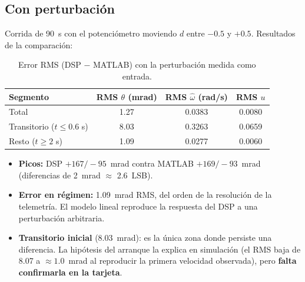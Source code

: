 \documentclass[11pt,a4paper]{article}
\begin{document}
\subsection{Con perturbaci\'on}
Corrida de 90~s con el potenci\'ometro moviendo $d$ entre $-0.5$ y $+0.5$. Resultados de la comparaci\'on:
\begin{table}[H]\centering\small
\begin{tabular}{@{}lccc@{}}\toprule
Segmento & RMS $\theta$ (mrad) & RMS $\hat\omega$ (rad/s) & RMS $u$ \\ \midrule
Total & 1.27 & 0.0383 & 0.0080 \\
Transitorio ($t\le0.6$ s) & 8.03 & 0.3263 & 0.0659 \\
Resto ($t\ge2$ s) & 1.09 & 0.0277 & 0.0060 \\ \bottomrule
\end{tabular}
\caption{Error RMS (DSP $-$ MATLAB) con la perturbaci\'on medida como entrada.}
\end{table}
\begin{itemize}[leftmargin=1.6em]
\item \textbf{Picos:} DSP $+167/-95$~mrad contra MATLAB $+169/-93$~mrad (diferencias de 2~mrad $\approx$ 2.6~LSB).
\item \textbf{Error en r\'egimen:} 1.09~mrad RMS, del orden de la resoluci\'on de la telemetr\'ia. El modelo
lineal reproduce la respuesta del DSP a una perturbaci\'on arbitraria.
\item \textbf{Transitorio inicial} (8.03~mrad): es la \'unica zona donde persiste una diferencia. La hip\'otesis del
arranque la explica en simulaci\'on (el RMS baja de 8.07 a $\approx1.0$~mrad al reproducir la primera velocidad
observada), pero \textbf{falta confirmarla en la tarjeta}.
\end{itemize}
\end{document}
